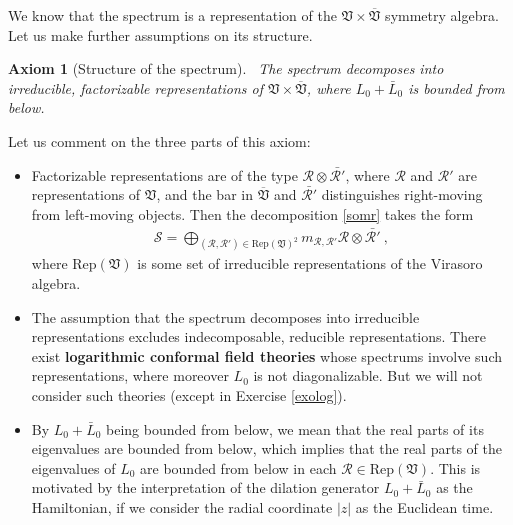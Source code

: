 \documentclass[12pt, a4paper, notitlepage, twoside]{report}
\numberwithin{equation}{section}
\theoremstyle{break}
\newtheorem{hyp}{Axiom}[chapter]
\begin{document}
We know that the spectrum is a representation of the 
$\mathfrak{V}\times \overline{\mathfrak{V}}$ symmetry algebra.
Let us make further assumptions on its structure.

\begin{hyp}[Structure of the spectrum]
 ~\label{ax:sots}
 The spectrum decomposes into irreducible, factorizable representations of $\mathfrak{V}\times \overline{\mathfrak{V}}$, where $L_0+\bar L_0$ is bounded from below.
\end{hyp} 
\noindent
Let us comment on the three parts of this axiom:
\begin{itemize}
 \item 
 Factorizable representations are of the type $\mathcal{R}\otimes \bar{\mathcal{R}'}$, where $\mathcal{R}$ and $\mathcal{R}'$ are representations of $\mathfrak{V}$, and the bar in $\overline{\mathfrak{V}}$ and $\bar{\mathcal{R}'}$ distinguishes right-moving from left-moving objects. 
Then the decomposition \eqref{somr} takes the form
\begin{align}
 \boxed{\mathcal{S} = \bigoplus_{(\mathcal{R},\mathcal{R}')\in \text{Rep}(\mathfrak{V})^2} m_{\mathcal{R},\mathcal{R}'} \mathcal{R}\otimes \bar{\mathcal{R}'}}\ ,
\label{sorr}
\end{align}
where $\text{Rep}(\mathfrak{V})$ is some set of irreducible representations of the Virasoro algebra.
\item
The assumption that the spectrum decomposes into irreducible representations excludes indecomposable, reducible representations. 
There exist \textbf{\boldmath logarithmic conformal field theories} whose spectrums involve such representations, where moreover $L_0$ is not diagonalizable. 
But we will not consider such theories (except in Exercise \ref{exolog}).
\item 
By $L_0+\bar L_0$ being bounded from below, we mean that the real parts of its eigenvalues are bounded from below, which implies that the real parts of the eigenvalues of $L_0$ are bounded from below in each $\mathcal{R}\in\text{Rep}(\mathfrak{V})$. 
This is motivated by the interpretation of the dilation generator $L_0+\bar L_0$ as the Hamiltonian, if we consider the radial coordinate $|z|$ as the Euclidean time. 
\end{itemize}
\end{document}
